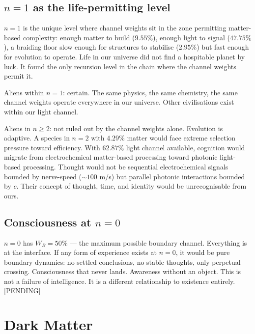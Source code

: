 \documentclass[prd,twocolumn,preprintnumbers,amsmath,amssymb]{revtex4-2}
\newcommand{\pending}{\textcolor{red!70!black}{[PENDING]}}
\begin{document}
\subsection{$n=1$ as the life-permitting level}

$n=1$ is the unique level where channel weights sit in the zone
permitting matter-based complexity: enough matter to build ($9.55\%$),
enough light to signal ($47.75\%$), a braiding floor slow enough
for structures to stabilise ($2.95\%$) but fast enough for
evolution to operate. Life in our universe did not find a
hospitable planet by luck. It found the only recursion level
in the chain where the channel weights permit it.

Aliens within $n=1$: certain. The same physics, the same
chemistry, the same channel weights operate everywhere in our
universe. Other civilisations exist within our light channel.

Aliens in $n \geq 2$: not ruled out by the channel weights
alone. Evolution is adaptive. A species in $n=2$ with $4.29\%$
matter would face extreme selection pressure toward efficiency.
With $62.87\%$ light channel available, cognition would migrate
from electrochemical matter-based processing toward photonic
light-based processing. Thought would not be sequential
electrochemical signals bounded by nerve-speed ($\sim 100$ m/s)
but parallel photonic interactions bounded by $c$. Their concept
of thought, time, and identity would be unrecognisable from ours.

\subsection{Consciousness at $n=0$}

$n=0$ has $W_B = 50\%$ --- the maximum possible boundary channel.
Everything is at the interface. If any form of experience exists
at $n=0$, it would be pure boundary dynamics: no settled
conclusions, no stable thoughts, only perpetual crossing.
Consciousness that never lands. Awareness without an object.
This is not a failure of intelligence. It is a different
relationship to existence entirely. \pending

\section{Dark Matter}
\label{sec:darkmatter}
\end{document}
